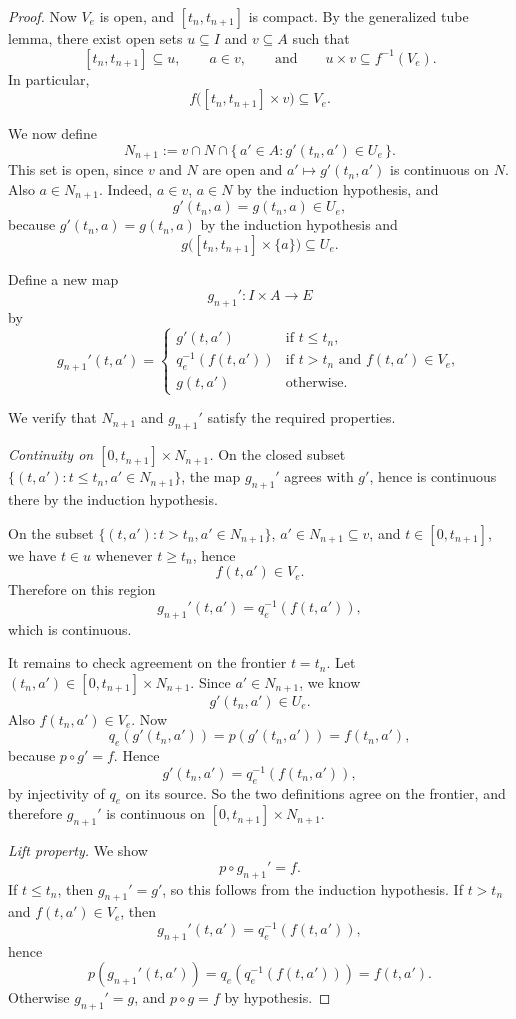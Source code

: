 \documentclass{article}
\begin{document}
\begin{proof}
Now \(V_e\) is open, and \([t_n,t_{n+1}]\) is compact. By the generalized tube lemma, there exist open sets \(u \subseteq I\) and \(v \subseteq A\) such that
\[
[t_n,t_{n+1}] \subseteq u,\qquad a \in v,
\qquad\text{and}\qquad
u \times v \subseteq f^{-1}(V_e).
\]
In particular,
\[
f\bigl([t_n,t_{n+1}] \times v\bigr) \subseteq V_e.
\]

We now define
\[
N_{n+1}
:=
v \cap N \cap \{\,a' \in A : g'(t_n,a') \in U_e\,\}.
\]
This set is open, since \(v\) and \(N\) are open and \(a' \mapsto g'(t_n,a')\) is continuous on \(N\).
Also \(a \in N_{n+1}\). Indeed, \(a\in v\), \(a\in N\) by the induction hypothesis, and
\[
g'(t_n,a)=g(t_n,a)\in U_e,
\]
because \(g'(t_n,a)=g(t_n,a)\) by the induction hypothesis and
\[
g\bigl([t_n,t_{n+1}] \times \{a\}\bigr)\subseteq U_e.
\]

Define a new map
\[
g_{n+1}' : I \times A \to E
\]
by
\[
g_{n+1}'(t,a')=
\begin{cases}
g'(t,a') & \text{if } t \le t_n,\\
q_e^{-1}(f(t,a')) & \text{if } t>t_n \text{ and } f(t,a') \in V_e,\\
g(t,a') & \text{otherwise.}
\end{cases}
\]

We verify that \(N_{n+1}\) and \(g_{n+1}'\) satisfy the required properties.

\medskip

\noindent\emph{Continuity on \([0,t_{n+1}] \times N_{n+1}\).}
On the closed subset \(\{(t,a'):t \le t_n, a' \in N_{n+1}\}\), the map \(g_{n+1}'\) agrees with \(g'\), hence is continuous there by the induction hypothesis.

On the subset \(\{(t,a'):t>t_n,a' \in N_{n+1}\}\), \(a' \in N_{n+1}\subseteq v\), and \(t \in [0,t_{n+1}]\), we have \(t \in u\) whenever \(t\ge t_n\), hence
\[
f(t,a') \in V_e.
\]
Therefore on this region
\[
g_{n+1}'(t,a') = q_e^{-1}(f(t,a')),
\]
which is continuous.

It remains to check agreement on the frontier \(t=t_n\). Let \((t_n,a') \in [0,t_{n+1}] \times N_{n+1}\). Since \(a' \in N_{n+1}\), we know
\[
g'(t_n,a') \in U_e.
\]
Also \(f(t_n,a') \in V_e\). Now
\[
q_e(g'(t_n,a')) = p(g'(t_n,a')) = f(t_n,a'),
\]
because \(p\circ g'=f\). Hence
\[
g'(t_n,a') = q_e^{-1}(f(t_n,a')),
\]
by injectivity of \(q_e\) on its source. So the two definitions agree on the frontier, and therefore \(g_{n+1}'\) is continuous on \([0,t_{n+1}] \times N_{n+1}\).

\medskip

\noindent\emph{Lift property.}
We show
\[
p \circ g_{n+1}' = f.
\]
If \(t \le t_n\), then \(g_{n+1}'=g'\), so this follows from the induction hypothesis. If \(t>t_n\) and \(f(t,a')\in V_e\), then
\[
g_{n+1}'(t,a') = q_e^{-1}(f(t,a')),
\]
hence
\[
p(g_{n+1}'(t,a')) = q_e(q_e^{-1}(f(t,a'))) = f(t,a').
\]
Otherwise \(g_{n+1}'=g\), and \(p\circ g=f\) by hypothesis.


\end{proof}
\end{document}
